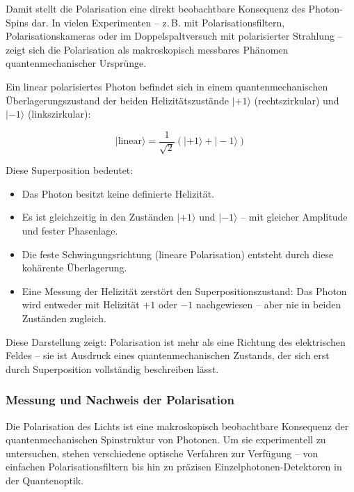 \vspace{0.5em}
Damit stellt die Polarisation eine direkt beobachtbare Konsequenz des Photon-Spins dar. In vielen Experimenten – z.\,B. mit Polarisationsfiltern, Polarisationskameras oder im Doppelspaltversuch mit polarisierter Strahlung – zeigt sich die Polarisation als makroskopisch messbares Phänomen quantenmechanischer Ursprünge.
\vspace{1em}
\begin{tcolorbox}[physikbox, title=Superposition und Polarisation]
	\label{box:Superposition und Polarisation}
	Ein linear polarisiertes Photon befindet sich in einem quantenmechanischen Überlagerungszustand der beiden Helizitätszustände $|+1\rangle$ (rechtszirkular) und $|-1\rangle$ (linkszirkular):
	
	\[
	|\text{linear}\rangle = \frac{1}{\sqrt{2}} \left( |+1\rangle + |-1\rangle \right)
	\]
	
	Diese Superposition bedeutet:
	\begin{itemize}
		\item Das Photon besitzt keine definierte Helizität.
		\item Es ist gleichzeitig in den Zuständen $|+1\rangle$ und $|-1\rangle$ – mit gleicher Amplitude und fester Phasenlage.
		\item Die feste Schwingungsrichtung (lineare Polarisation) entsteht durch diese kohärente Überlagerung.
		\item Eine Messung der Helizität zerstört den Superpositionszustand: Das Photon wird entweder mit Helizität $+1$ oder $-1$ nachgewiesen – aber nie in beiden Zuständen zugleich.
	\end{itemize}
	
	Diese Darstellung zeigt: Polarisation ist mehr als eine Richtung des elektrischen Feldes – sie ist Ausdruck eines quantenmechanischen Zustands, der sich erst durch Superposition vollständig beschreiben lässt.
\end{tcolorbox}

\subsubsection{Messung und Nachweis der Polarisation}

Die Polarisation des Lichts ist eine makroskopisch beobachtbare Konsequenz der quantenmechanischen Spinstruktur von Photonen. Um sie experimentell zu untersuchen, stehen verschiedene optische Verfahren zur Verfügung – von einfachen Polarisationsfiltern bis hin zu präzisen Einzelphotonen-Detektoren in der Quantenoptik.

